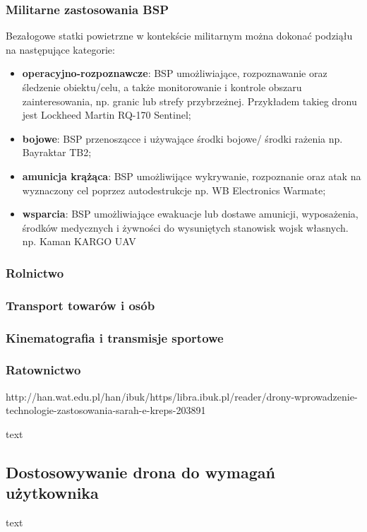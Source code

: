 \subsubsection{Militarne zastosowania BSP}
\hspace{1cm}Bezałogowe statki powietrzne w kontekście militarnym można dokonać podziąłu na następujące kategorie: 
\begin{itemize}
  \item \textbf{operacyjno-rozpoznawcze}: BSP umożliwiające, rozpoznawanie oraz śledzenie obiektu/celu, a także monitorowanie i kontrole obszaru zainteresowania, np. granic lub strefy przybrzeżnej. Przykładem takieg dronu jest Lockheed Martin RQ-170 Sentinel;
  \item \textbf{bojowe}: BSP przenoszącce i używające środki bojowe/ środki rażenia np. Bayraktar TB2;
  \item \textbf{amunicja krążąca}: BSP umożliwijące wykrywanie, rozpoznanie oraz atak na wyznaczony cel poprzez autodestrukcje np. WB Electronics Warmate;
  \item \textbf{wsparcia}: BSP umożliwiające ewakuacje lub dostawe amunicji, wyposażenia, środków medycznych i żywności do wysuniętych stanowisk wojsk własnych. np. Kaman KARGO UAV  \cite{konkurs-mon}
\end{itemize}

\subsubsection{Rolnictwo}
\subsubsection{Transport towarów i osób}
\subsubsection{Kinematografia i transmisje sportowe}
\subsubsection{Ratownictwo}

\hspace{1cm} http://han.wat.edu.pl/han/ibuk/https/libra.ibuk.pl/reader/drony-wprowadzenie-technologie-zastosowania-sarah-e-kreps-203891

\hspace{1cm}text
\subsection{Dostosowywanie drona do wymagań użytkownika}
\hspace{1cm}text

